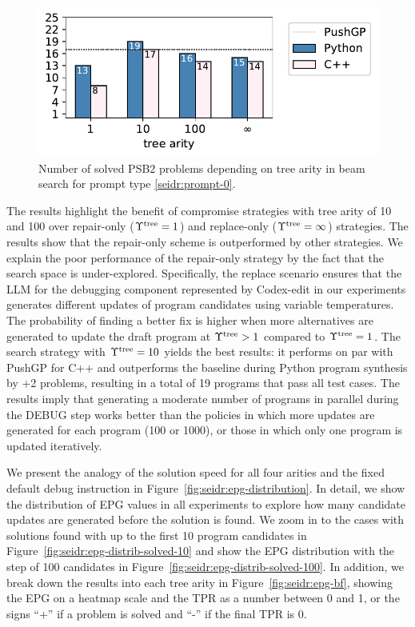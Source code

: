 \begin{figure}
  \centering
  \includegraphics[width=0.8\linewidth, trim={0mm 2.8mm 0mm 2mm}, clip]{images/num_solved_problems_vs_bf_1000_v3_zenodo.pdf}
  \caption{Number of solved PSB2 problems depending on tree arity in beam search for prompt type \ref{seidr:prompt-0}.}
  \label{fig:seidr:solved-vs-bf}
\end{figure}

The results highlight the benefit of compromise strategies with tree arity of 10 and 100 over repair-only ($\Upsilon^\text{tree}=1$) and replace-only ($\Upsilon^\text{tree}=\infty$) strategies. 
The results show that the repair-only scheme is outperformed by other strategies. 
We explain the poor performance of the repair-only strategy by the fact that the search space is under-explored. 
Specifically, the replace scenario ensures that the LLM for the debugging component represented by Codex-edit in our experiments generates different updates of program candidates using variable temperatures.
The probability of finding a better fix is higher when more alternatives are generated to update the draft program at $\Upsilon^\text{tree}>1$ compared to $\Upsilon^\text{tree}=1$. 
The search strategy with $\Upsilon^\text{tree}=10$ yields the best results: it performs on par with PushGP for C++ and outperforms the baseline during Python program synthesis by +2 problems, resulting in a total of 19 programs that pass all test cases.
The results imply that generating a moderate number of programs in parallel during the DEBUG step works better than the policies in which more updates are generated for each program (100 or 1000), 
or those in which only one program is updated iteratively.

We present the analogy of the solution speed for all four arities and the fixed default debug instruction in Figure~\ref{fig:seidr:epg-distribution}. 
In detail, we show the distribution of EPG values in all experiments to explore how many candidate updates are generated before the solution is found.
We zoom in to the cases with solutions found with up to the first 10 program candidates in Figure~\ref{fig:seidr:epg-distrib-solved-10} and show the EPG distribution with the step of 100 candidates in Figure~\ref{fig:seidr:epg-distrib-solved-100}. 
In addition, we break down the results into each tree arity in Figure~\ref{fig:seidr:epg-bf}, showing the EPG on a heatmap scale and the TPR as a number between 0 and 1, or the signs ``+'' if a problem is solved and ``-'' if the final TPR is 0. 


